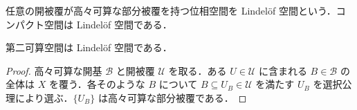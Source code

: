 \begin{defn}[Lindelöf空間]
任意の開被覆が高々可算な部分被覆を持つ位相空間を Lindelöf 空間という．コンパクト空間は Lindelöf 空間である．
\end{defn}
\begin{prop}[第二可算空間のLindelöf性]
第二可算空間は Lindelöf 空間である．
\end{prop}
\begin{proof}
高々可算な開基 $\mathcal B$ と開被覆 $\mathcal U$ を取る．ある $U\in\mathcal U$ に含まれる $B\in\mathcal B$ の全体は $X$ を覆う．各そのような $B$ について $B\subseteq U_B\in\mathcal U$ を満たす $U_B$ を選択公理により選ぶ．$\{U_B\}$ は高々可算な部分被覆である．
\end{proof}

